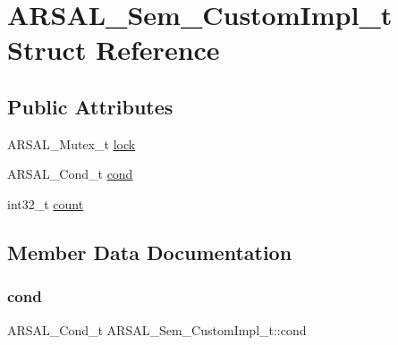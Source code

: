 \hypertarget{structARSAL__Sem__CustomImpl__t}{}\section{A\+R\+S\+A\+L\+\_\+\+Sem\+\_\+\+Custom\+Impl\+\_\+t Struct Reference}
\label{structARSAL__Sem__CustomImpl__t}
\subsection*{Public Attributes}
\begin{DoxyCompactItemize}
\item 
A\+R\+S\+A\+L\+\_\+\+Mutex\+\_\+t \hyperlink{structARSAL__Sem__CustomImpl__t_a5b0c944edc475b603049210aa09f4383}{lock}
\item 
A\+R\+S\+A\+L\+\_\+\+Cond\+\_\+t \hyperlink{structARSAL__Sem__CustomImpl__t_ab67e2f2e89177d49e7ec68b55dc0a5c7}{cond}
\item 
int32\+\_\+t \hyperlink{structARSAL__Sem__CustomImpl__t_a14d1d2a87d385225e8b1bc61b87f5231}{count}
\end{DoxyCompactItemize}


\subsection{Member Data Documentation}
\hypertarget{structARSAL__Sem__CustomImpl__t_ab67e2f2e89177d49e7ec68b55dc0a5c7}{}\label{structARSAL__Sem__CustomImpl__t_ab67e2f2e89177d49e7ec68b55dc0a5c7} 
\subsubsection{\texorpdfstring{cond}{cond}}
{\footnotesize\ttfamily A\+R\+S\+A\+L\+\_\+\+Cond\+\_\+t A\+R\+S\+A\+L\+\_\+\+Sem\+\_\+\+Custom\+Impl\+\_\+t\+::cond}

\hypertarget{structARSAL__Sem__CustomImpl__t_a14d1d2a87d385225e8b1bc61b87f5231}{}\label{structARSAL__Sem__CustomImpl__t_a14d1d2a87d385225e8b1bc61b87f5231} 
